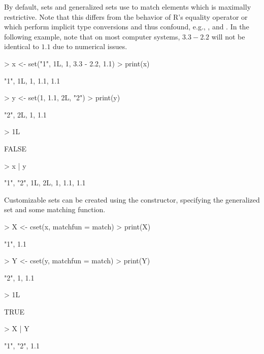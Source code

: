 \documentclass[article]{jss}
\newcommand\R{\textsf{R}}
\newcommand{\codefun}[1]{\code{#1()}}
\begin{document}
By default, sets and generalized sets use
\codefun{identical} to match elements which is maximally
restrictive. Note that this differs from the behavior of
\R's equality operator or
\codefun{match} which perform implicit type conversions
and thus confound, e.g., ,  and . In the
following example, note that on most computer systems, $3.3-2.2$ will not be
identical to $1.1$ due to numerical issues.
\begin{Schunk}
\begin{Sinput}
> x <- set("1", 1L, 1, 3.3 - 2.2, 1.1)
> print(x)
\end{Sinput}
\begin{Soutput}
{"1", 1L, 1, 1.1, 1.1}
\end{Soutput}
\begin{Sinput}
> y <- set(1, 1.1, 2L, "2")
> print(y)
\end{Sinput}
\begin{Soutput}
{"2", 2L, 1, 1.1}
\end{Soutput}
\begin{Sinput}
> 1L %
\end{Sinput}
\begin{Soutput}
[1] FALSE
\end{Soutput}
\begin{Sinput}
> x | y
\end{Sinput}
\begin{Soutput}
{"1", "2", 1L, 2L, 1, 1.1, 1.1}
\end{Soutput}
\end{Schunk}
Customizable sets can be created using the \codefun{cset} constructor,
specifying the generalized set and some matching function.
\begin{Schunk}
\begin{Sinput}
> X <- cset(x, matchfun = match)
> print(X)
\end{Sinput}
\begin{Soutput}
{"1", 1.1}
\end{Soutput}
\begin{Sinput}
> Y <- cset(y, matchfun = match)
> print(Y)
\end{Sinput}
\begin{Soutput}
{"2", 1, 1.1}
\end{Soutput}
\begin{Sinput}
> 1L %
\end{Sinput}
\begin{Soutput}
[1] TRUE
\end{Soutput}
\begin{Sinput}
> X | Y
\end{Sinput}
\begin{Soutput}
{"1", "2", 1.1}
\end{Soutput}
\end{Schunk}
\end{document}
